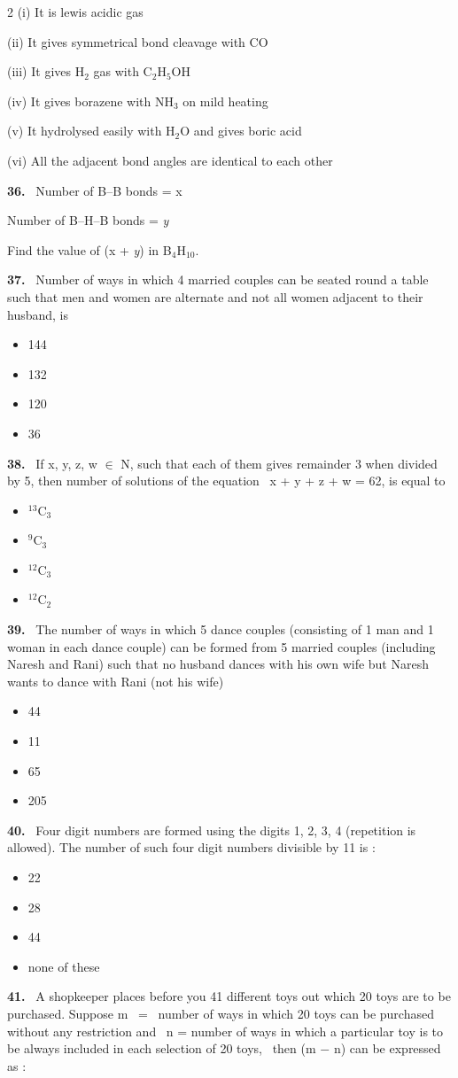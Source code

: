 \documentclass[10pt]{extarticle}
\newcommand{\papersec}[1]{\par\bigskip{\centering\Large\bfseries PAPER-#1\par}\medskip}
\newcommand{\partsec}[2]{\par\medskip\noindent{\large\bfseries PART-#1: #2}\par\smallskip}
\newcommand{\qn}[1]{\par\smallskip\noindent\textbf{#1.}~}
\newenvironment{qoptions}{\begin{itemize}[leftmargin=1.8em,itemsep=1pt,topsep=2pt,label={}]}{\end{itemize}}
\newcommand{\opt}[2]{\item[(#1)] #2}
\begin{document}
\begin{multicols}{2}
(i) It is lewis acidic gas\par
(ii) It gives symmetrical bond cleavage with CO\par
(iii) It gives H$_2$ gas with C$_2$H$_5$OH\par
(iv) It gives borazene with NH$_3$ on mild heating\par
(v) It hydrolysed easily with H$_2$O and gives boric acid\par
(vi) All the adjacent bond angles are identical to each other
\qn{36} Number of B--B bonds = x\par
Number of B--H--B bonds = \textit{y}\par
Find the value of (x + \textit{y}) in B$_4$H$_{10}$.
\raggedcolumns
\papersec{1}
\partsec{3}{MATHEMATICS}
\qn{37} Number of ways in which 4 married couples can be seated round a table such that men and women are alternate and not all women adjacent to their husband, is
\begin{qoptions}
\opt{A}{144}
\opt{B}{132}
\opt{C}{120}
\opt{D}{36}
\end{qoptions}
\qn{38} If x, y, z, w $\in$ N, such that each of them gives remainder 3 when divided by 5, then number of solutions of the equation \ x + y + z + w = 62, is equal to
\begin{qoptions}
\opt{A}{$^{13}$C$_3$}
\opt{B}{$^9$C$_3$}
\opt{C}{$^{12}$C$_3$}
\opt{D}{$^{12}$C$_2$}
\end{qoptions}
\qn{39} The number of ways in which 5 dance couples (consisting of 1 man and 1 woman in each dance couple) can be formed from 5 married couples (including Naresh and Rani) such that no husband dances with his own wife but Naresh wants to dance with Rani (not his wife)
\begin{qoptions}
\opt{A}{44}
\opt{B}{11}
\opt{C}{65}
\opt{D}{205}
\end{qoptions}
\qn{40} Four digit numbers are formed using the digits 1, 2, 3, 4 (repetition is allowed). The number of such four digit numbers divisible by 11 is :
\begin{qoptions}
\opt{A}{22}
\opt{B}{28}
\opt{C}{44}
\opt{D}{none of these}
\end{qoptions}
\qn{41} A shopkeeper places before you 41 different toys out which 20 toys are to be purchased. Suppose m \ = \ number of ways in which 20 toys can be purchased without any restriction and \ n = number of ways in which a particular toy is to be always included in each selection of 20 toys, \ then (m $-$ n) can be expressed as :
\begin{qoptions}

\end{qoptions}
\end{multicols}
\end{document}
